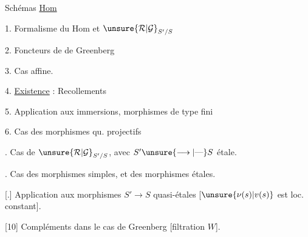Schémas \uline{Hom}  

1. Formalisme du Hom et $\unsure{\mathcal R|\mathcal G}_{S'/S}$

2.   Foncteurs de   de Greenberg

3.  Cas affine. 

4. \uline{Existence}  : Recollements 

5. Application aux immersions, morphismes de type fini 

6. Cas des morphismes qu. projectifs 

.  Cas de $\unsure{\mathcal R|\mathcal G}_{S'/S}$, avec $S'\unsure{\longrightarrow|\text{—}}S$ étale.

. Cas des morphismes simples, et des morphismes étales. 

[.] Application aux morphismes $S'\to S$ quasi-étales [$\unsure{\nu(s)|v(s)}$ est loc. constant]. 

[10] Compléments dans le cas de Greenberg [filtration  $W$].
